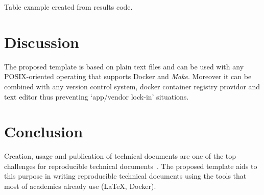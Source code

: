 \documentclass[journal]{IEEEtran}
\begin{document}
\begin{table}[h]
	\centering
	\caption{Table example created from results code.}
	\label{table:table}
	\setlength\tabcolsep{2pt}
	
\end{table}

\section{Discussion}
The proposed template is based on plain text files and can be used with any POSIX-oriented operating that supports Docker and \textit{Make}.
Moreover it can be combined with any version control system, docker container registry providor and text editor thus preventing `app/vendor lock-in' situations.

\section{Conclusion}
Creation, usage and publication of technical documents are one of the top challenges for reproducible technical documents~\cite{barba2019praxis}.
The proposed template aids to this purpose in writing reproducible technical documents using the tools that most of academics already use (\LaTeX, Docker).



\end{document}
